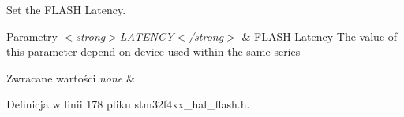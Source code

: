 Set the F\+L\+A\+SH Latency. 


\begin{DoxyParams}{Parametry}
{\em $<$strong$>$\+L\+A\+T\+E\+N\+C\+Y$<$/strong$>$} & F\+L\+A\+SH Latency The value of this parameter depend on device used within the same series \\
\hline
\end{DoxyParams}

\begin{DoxyRetVals}{Zwracane wartości}
{\em none} & \\
\hline
\end{DoxyRetVals}


Definicja w linii 178 pliku stm32f4xx\+\_\+hal\+\_\+flash.\+h.

